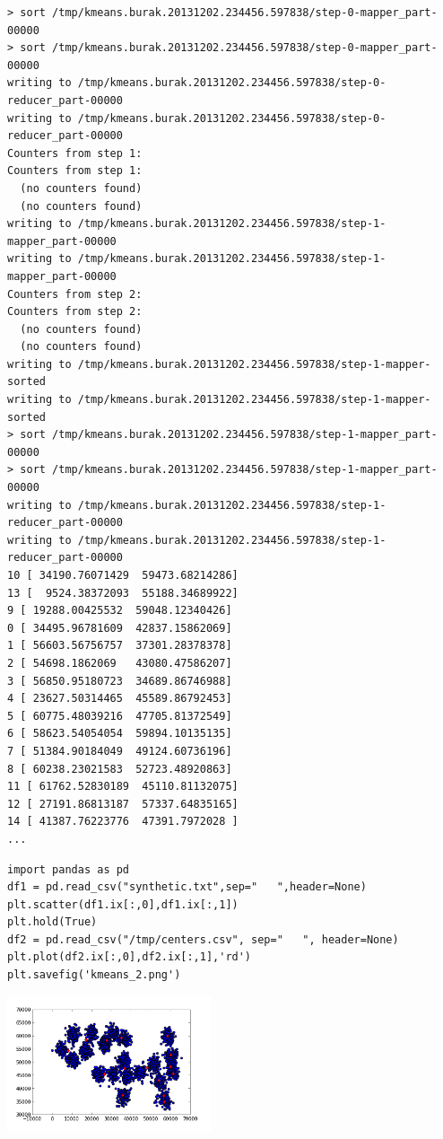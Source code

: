 \documentclass[12pt,fleqn]{article}\usepackage{../common}
\begin{document}
\begin{verbatim}
> sort /tmp/kmeans.burak.20131202.234456.597838/step-0-mapper_part-00000
> sort /tmp/kmeans.burak.20131202.234456.597838/step-0-mapper_part-00000
writing to /tmp/kmeans.burak.20131202.234456.597838/step-0-reducer_part-00000
writing to /tmp/kmeans.burak.20131202.234456.597838/step-0-reducer_part-00000
Counters from step 1:
Counters from step 1:
  (no counters found)
  (no counters found)
writing to /tmp/kmeans.burak.20131202.234456.597838/step-1-mapper_part-00000
writing to /tmp/kmeans.burak.20131202.234456.597838/step-1-mapper_part-00000
Counters from step 2:
Counters from step 2:
  (no counters found)
  (no counters found)
writing to /tmp/kmeans.burak.20131202.234456.597838/step-1-mapper-sorted
writing to /tmp/kmeans.burak.20131202.234456.597838/step-1-mapper-sorted
> sort /tmp/kmeans.burak.20131202.234456.597838/step-1-mapper_part-00000
> sort /tmp/kmeans.burak.20131202.234456.597838/step-1-mapper_part-00000
writing to /tmp/kmeans.burak.20131202.234456.597838/step-1-reducer_part-00000
writing to /tmp/kmeans.burak.20131202.234456.597838/step-1-reducer_part-00000
10 [ 34190.76071429  59473.68214286]
13 [  9524.38372093  55188.34689922]
9 [ 19288.00425532  59048.12340426]
0 [ 34495.96781609  42837.15862069]
1 [ 56603.56756757  37301.28378378]
2 [ 54698.1862069   43080.47586207]
3 [ 56850.95180723  34689.86746988]
4 [ 23627.50314465  45589.86792453]
5 [ 60775.48039216  47705.81372549]
6 [ 58623.54054054  59894.10135135]
7 [ 51384.90184049  49124.60736196]
8 [ 60238.23021583  52723.48920863]
11 [ 61762.52830189  45110.81132075]
12 [ 27191.86813187  57337.64835165]
14 [ 41387.76223776  47391.7972028 ]
...
\end{verbatim}

\begin{verbatim}
import pandas as pd
df1 = pd.read_csv("synthetic.txt",sep="   ",header=None)
plt.scatter(df1.ix[:,0],df1.ix[:,1])
plt.hold(True)
df2 = pd.read_csv("/tmp/centers.csv", sep="   ", header=None)
plt.plot(df2.ix[:,0],df2.ix[:,1],'rd')
plt.savefig('kmeans_2.png')
\end{verbatim}

\includegraphics[height=4cm]{kmeans_2.png}
\end{document}
